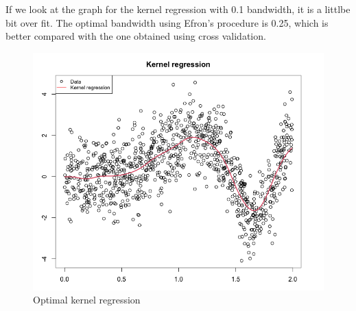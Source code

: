 \documentclass[12pt]{article}
\begin{document}
If we look at the graph for the kernel regression with 0.1 bandwidth, it is a littlbe bit over fit. The optimal bandwidth using Efron's procedure is 0.25, which is better compared with the one obtained using cross validation.
\begin{figure}
\begin{center}
\caption{Optimal kernel regression}
\includegraphics[scale=0.50]{kernel regression}
\end{center}
\end{figure}
\end{document}
